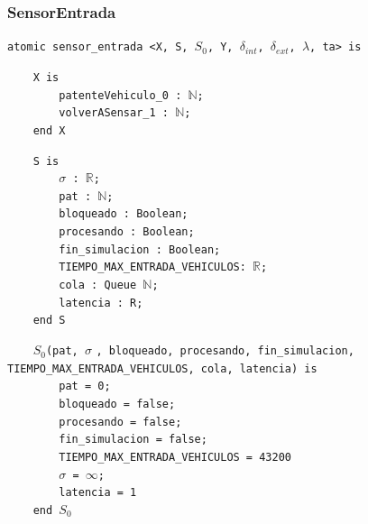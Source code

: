 \documentclass[12pt]{article}
\begin{document}
\subsubsection{SensorEntrada}

\begin{tcolorbox}[
    colback=black!5!white,
    colframe=black!80!white,
    boxrule=0.8pt,
    arc=2pt,
    left=5pt,
    right=5pt,
    top=5pt,
    bottom=5pt,
    fontupper=\ttfamily,
    breakable
]
\begin{flushleft}
\texttt{atomic sensor\_entrada <X, S, $S_0$, Y, }$\delta_{int}$\texttt{, }$\delta_{ext}$\texttt{, }$\lambda$\texttt{, ta> is}
\end{flushleft}

\begin{flushleft}
\texttt{~~~~X is} \\
\texttt{~~~~~~~~patenteVehiculo\_0 : }\(\mathbb{N}\)\texttt{;} \\
\texttt{~~~~~~~~volverASensar\_1 : }\(\mathbb{N}\)\texttt{;} \\
\texttt{~~~~end X}
\end{flushleft}

\begin{flushleft}
\texttt{~~~~S is} \\
\texttt{~~~~~~~~}$\sigma$\texttt{ : }\(\mathbb{R}\)\texttt{;} \\
\texttt{~~~~~~~~pat : }\(\mathbb{N}\)\texttt{;} \\
\texttt{~~~~~~~~bloqueado : Boolean;} \\
\texttt{~~~~~~~~procesando : Boolean;} \\
\texttt{~~~~~~~~fin\_simulacion : Boolean;} \\
\texttt{~~~~~~~~TIEMPO\_MAX\_ENTRADA\_VEHICULOS: }\(\mathbb{R}\)\texttt{;} \\
\texttt{~~~~~~~~cola : Queue }\(\mathbb{N}\)\texttt{;} \\
\texttt{~~~~~~~~latencia : R;} \\
\texttt{~~~~end S}
\end{flushleft}

\begin{flushleft}
\texttt{~~~~$S_0$(pat, }$\sigma$ \texttt{, bloqueado, procesando, fin\_simulacion, TIEMPO\_MAX\_ENTRADA\_VEHICULOS, cola, latencia) is} \\
\texttt{~~~~~~~~pat = 0;} \\
\texttt{~~~~~~~~bloqueado = false;} \\
\texttt{~~~~~~~~procesando = false;} \\
\texttt{~~~~~~~~fin\_simulacion = false;} \\
\texttt{~~~~~~~~TIEMPO\_MAX\_ENTRADA\_VEHICULOS = 43200 } \\
\texttt{~~~~~~~~}$\sigma$\texttt{ = }$\infty$\texttt{;} \\
\texttt{~~~~~~~~latencia = 1 } \\
\texttt{~~~~end }$S_0$
\end{flushleft}


\end{tcolorbox}
\end{document}
